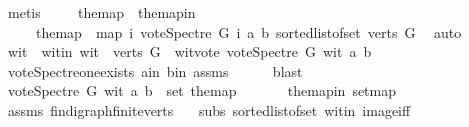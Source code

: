 \begin{isabellebody}
\ metis\ \isanewline
\ \ \isamarkupfalse%
\ the{\isacharunderscore}{\kern0pt}map\ \ the{\isacharunderscore}{\kern0pt}map{\isacharunderscore}{\kern0pt}in{\isacharcolon}{\kern0pt}\ \isanewline
\ \ \ \ \ {\isachardoublequoteopen}the{\isacharunderscore}{\kern0pt}map\ {\isacharequal}{\kern0pt}\ {\isacharparenleft}{\kern0pt}map\ {\isacharparenleft}{\kern0pt}{\isasymlambda}i{\isachardot}{\kern0pt}\ vote{\isacharunderscore}{\kern0pt}Spectre\ G\ i\ a\ b{\isacharparenright}{\kern0pt}\ {\isacharparenleft}{\kern0pt}sorted{\isacharunderscore}{\kern0pt}list{\isacharunderscore}{\kern0pt}of{\isacharunderscore}{\kern0pt}set\ {\isacharparenleft}{\kern0pt}verts\ G{\isacharparenright}{\kern0pt}{\isacharparenright}{\kern0pt}{\isacharparenright}{\kern0pt}{\isachardoublequoteclose}\ \isamarkupfalse%
\ auto\isanewline
\ \ \isamarkupfalse%
\ wit\ \ wit{\isacharunderscore}{\kern0pt}in{\isacharcolon}{\kern0pt}\ {\isachardoublequoteopen}wit\ {\isasymin}\ verts\ G{\isachardoublequoteclose}\ \ wit{\isacharunderscore}{\kern0pt}vote{\isacharcolon}{\kern0pt}\ {\isachardoublequoteopen}vote{\isacharunderscore}{\kern0pt}Spectre\ G\ wit\ a\ b\ {\isasymnoteq}\ {}{\isachardoublequoteclose}\isanewline
\ \ \ \ \isamarkupfalse%
\ vote{\isacharunderscore}{\kern0pt}Spectre{\isacharunderscore}{\kern0pt}one{\isacharunderscore}{\kern0pt}exists\ a{\isacharunderscore}{\kern0pt}in\ b{\isacharunderscore}{\kern0pt}in\ assms{\isacharparenleft}{\kern0pt}{}{\isacharparenright}{\kern0pt}\isanewline
\ \ \ \ \isamarkupfalse%
\ blast\ \isanewline
\ \ \isamarkupfalse%
\ {\isachardoublequoteopen}{\isacharparenleft}{\kern0pt}vote{\isacharunderscore}{\kern0pt}Spectre\ G\ wit\ a\ b{\isacharparenright}{\kern0pt}\ {\isasymin}\ set\ the{\isacharunderscore}{\kern0pt}map{\isachardoublequoteclose}\ \isanewline
\ \ \ \ \isamarkupfalse%
\ the{\isacharunderscore}{\kern0pt}map{\isacharunderscore}{\kern0pt}in\ set{\isacharunderscore}{\kern0pt}map\ \isanewline
\ \ \ \ \isamarkupfalse%
\ assms{\isacharparenleft}{\kern0pt}{}{\isacharparenright}{\kern0pt}\ fin{\isacharunderscore}{\kern0pt}digraph{\isachardot}{\kern0pt}finite{\isacharunderscore}{\kern0pt}verts\ \isanewline
\ \ subs\ sorted{\isacharunderscore}{\kern0pt}list{\isacharunderscore}{\kern0pt}of{\isacharunderscore}{\kern0pt}set{\isacharparenleft}{\kern0pt}{}{\isacharparenright}{\kern0pt}\ wit{\isacharunderscore}{\kern0pt}in\ image{\isacharunderscore}{\kern0pt}iff\isanewline

\end{isabellebody}
